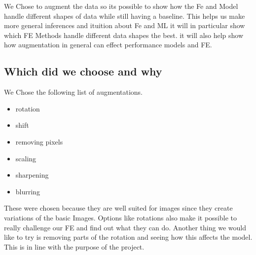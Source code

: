 We Chose to augment the data so its possible to show how the Fe and Model handle different shapes of data while still having a baseline. This helps us make more general inferences and ituition about Fe and ML it will in particular show which FE Methods handle different data shapes the best. it will also help show how augmentation in general can effect performance models  and FE.



\subsection{Which did we choose and why}
We Chose the following list of augmentations.

\begin{itemize}
    \item rotation
    \item shift
    \item removing pixels
    \item scaling
    \item sharpening
    \item blurring
  \end{itemize}

  These were chosen because they are well suited for images since they create variations of the basic Images. Options like rotations also make it possible to really challenge our FE and find out what they can do. Another thing we would like to try is removing parts of the rotation and seeing how this affects the model. This is in line with the purpose of the project. 




